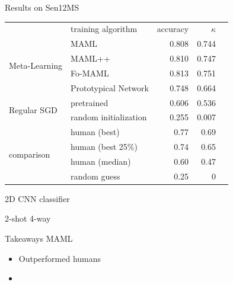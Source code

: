 \documentclass[11pt]{beamer}
\begin{document}
	\begin{frame}{Results on Sen12MS}
		\scriptsize
		\begin{tabular}{llrrr}
			\toprule
			& training algorithm & accuracy & $\kappa$ \\
			\cmidrule(lr){1-1}\cmidrule(lr){2-2}\cmidrule(lr){3-3}\cmidrule(lr){4-4}\cmidrule(lr){5-5}
			\multirow{4}{*}{Meta-Learning} & MAML & 0.808 & 0.744 \\
			& MAML++  & 0.810 & 0.747 \\
			& Fo-MAML  & 0.813 & 0.751 \\
			& Prototypical Network  & 0.748 & 0.664 \\
			\cmidrule(lr){1-2}
			\multirow{2}{*}{Regular SGD} & pretrained & 0.606 & 0.536 \\ %
			& random initialization & 0.255 & 0.007 \\
			\cmidrule(lr){1-2}
			\multirow{4}{*}{comparison} & human (best) & 0.77 & 0.69 \\
			& human (best 25\%) & 0.74 & 0.65 \\
			& human (median) & 0.60 & 0.47 &\\
			& random guess & 0.25 & 0 \\
			\bottomrule

			

		\end{tabular}
	
		2D CNN classifier
	
		2-shot 4-way
	\end{frame}

	\begin{frame}{Takeaways MAML}
		\begin{itemize}
			\item Outperformed humans 
			\item 
		\end{itemize}
	\end{frame}
	
\end{document}
